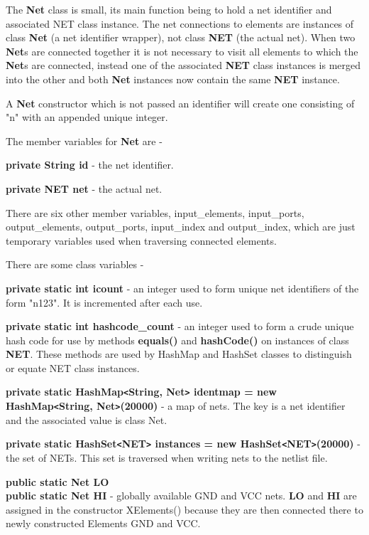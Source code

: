 The {\bf Net} class is small, its main function being to hold a net
identifier and associated NET class instance. The net connections to
elements are instances of class {\bf Net} (a net identifier wrapper),
not class {\bf NET} (the actual net). When two {\bf Net}s are connected
together it is not necessary to visit all elements to which the {\bf
Net}s are connected, instead one of the associated {\bf NET} class
instances is merged into the other and both {\bf Net} instances now
contain the same {\bf NET} instance.

A {\bf Net} constructor which is not passed an identifier will create
one consisting of "n" with an appended unique integer.

The member variables for {\bf Net} are -

{\bf private String id} - the net identifier.

{\bf private NET net} - the actual net.

There are six other member variables, input\_elements, input\_ports, output\_elements,
output\_ports, input\_index and output\_index, which are just temporary variables
used when traversing connected elements.

There are some class variables -

{\bf private static int icount} - an integer used to form unique
net identifiers of the form "n123". It is incremented after each use.

{\bf private static int hashcode\_count} - an integer used to form a
crude unique hash code for use by methods {\bf equals()} and {\bf
hashCode()} on instances of class {\bf NET}. These methods are used by
HashMap and HashSet classes to distinguish or equate NET class
instances.

{\bf private static HashMap\verb'<'String, Net\verb'>' identmap = new HashMap\verb'<'String,
Net\verb'>'(20000)} - a map of nets. The key is a net identifier and the
associated value is class Net.

{\bf private static HashSet\verb'<'NET\verb'>' instances = new HashSet\verb'<'NET\verb'>'(20000)} -
the set of NETs. This set is traversed when writing nets to the netlist
file.

{\bf public static Net LO} \\
{\bf public static Net HI} -
globally available GND and VCC nets. {\bf LO} and {\bf HI} are assigned
in the constructor XElements() because they are then connected there to
newly constructed Elements GND and VCC.




